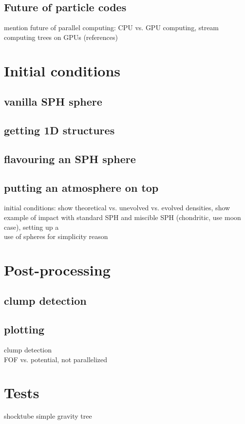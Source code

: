 \subsection{Future of particle codes}
mention future of parallel computing: CPU vs. GPU computing, stream computing
trees on GPUs (references)



\section{Initial conditions}
\subsection{vanilla SPH sphere}
\subsection{getting 1D structures}
\citep{Benz:1991p700}

\subsection{flavouring an SPH sphere}
\subsection{putting an atmosphere on top}
initial conditions: show theoretical vs. unevolved vs. evolved densities, show example of impact with standard SPH and miscible SPH (chondritic, use moon case), setting up a \SSC \\
use of spheres for simplicity reason


\section{Post-processing}
\subsection{clump detection}



\subsection{plotting}
clump detection\\
FOF vs. potential, not parallelized\\

\section{Tests}
shocktube
simple gravity tree

\citep{Abel:2010p3297}
\citep{Barnes:1986p2853}
\citep{bryant2010computer}
\citep{Melosh:2007p3502}
\citep{Monaghan:2005p2677}
\citep{Monaghan:1992ARAA..30..543M}
\citep{Ott:2003p3727}
\citep{Price:2004p2613}
\citep{Solenthaler:2008p3720}
\citep{Springel:2003p3298}
\citep{Springel:2005p51}







